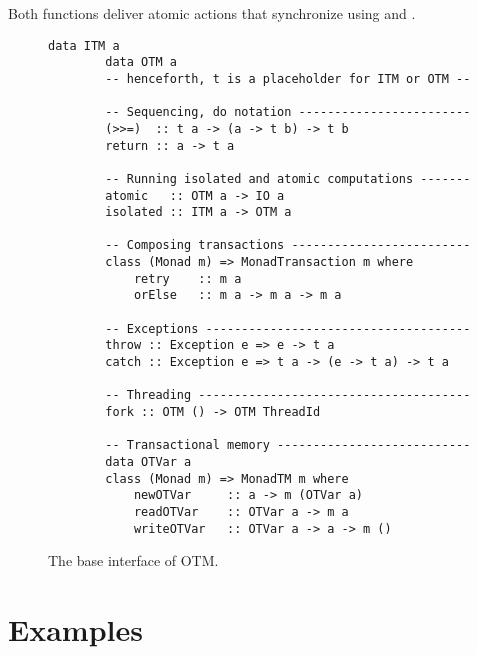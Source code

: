 Both functions deliver atomic actions that synchronize using
 and . 

\begin{figure}
    \centering
    \begin{Verbatim}[tabsize=3, gobble=2]
        data ITM a
        data OTM a
        -- henceforth, t is a placeholder for ITM or OTM --
        
        -- Sequencing, do notation ------------------------
        (>>=)  :: t a -> (a -> t b) -> t b
        return :: a -> t a
        
        -- Running isolated and atomic computations -------
        atomic   :: OTM a -> IO a
        isolated :: ITM a -> OTM a
        
        -- Composing transactions -------------------------
        class (Monad m) => MonadTransaction m where
            retry    :: m a
            orElse   :: m a -> m a -> m a
        
        -- Exceptions -------------------------------------
        throw :: Exception e => e -> t a
        catch :: Exception e => t a -> (e -> t a) -> t a
        
        -- Threading --------------------------------------
        fork :: OTM () -> OTM ThreadId
        
        -- Transactional memory ---------------------------
        data OTVar a
        class (Monad m) => MonadTM m where
            newOTVar     :: a -> m (OTVar a)
            readOTVar    :: OTVar a -> m a
            writeOTVar   :: OTVar a -> a -> m ()

    \end{Verbatim}
    \caption{The base interface of OTM.}
    \label{fig:base-interface}
\end{figure}

\section{Examples}
